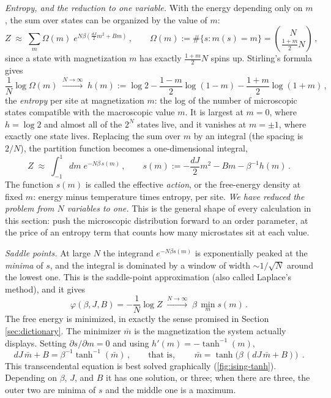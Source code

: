 \documentclass[11pt]{article}
\newcommand{\pd}{\partial}
\begin{document}
\emph{Entropy, and the reduction to one variable.} With the energy depending only on $m$, the sum over states can be organized by the value of $m$:
%
\begin{equation}
    Z \;\approx\; \sum_{m} \Omega(m)\; e^{N\beta\left(\frac{dJ}{2}m^2 + Bm\right)}\,,\qquad \Omega(m) := \#\{s : m(s) = m\} = \binom{N}{\frac{1+m}{2}N}\,,
\end{equation}
%
since a state with magnetization $m$ has exactly $\frac{1+m}{2}N$ spins up. Stirling's formula gives
%
\begin{equation}
    \frac{1}{N}\log\Omega(m) \;\xrightarrow{N\to\infty}\; h(m) := \log 2 - \frac{1-m}{2}\log(1-m) - \frac{1+m}{2}\log(1+m)\,, \label{ising-entropy}
\end{equation}
%
the \emph{entropy} per site at magnetization $m$: the log of the number of microscopic states compatible with the macroscopic value $m$. It is largest at $m=0$, where $h = \log 2$ and almost all of the $2^N$ states live, and it vanishes at $m=\pm1$, where exactly one state lives. Replacing the sum over $m$ by an integral (the spacing is $2/N$), the partition function becomes a one-dimensional integral,
%
\begin{equation}
    Z \;\approx\; \int_{-1}^{1} dm\; e^{-N\beta\, s(m)}\,,\qquad
    s(m) := -\frac{dJ}{2}m^2 - Bm - \beta^{-1}h(m)\,. \label{ising-action}
\end{equation}
%
The function $s(m)$ is called the effective \emph{action}, or the free-energy density at fixed $m$: energy minus temperature times entropy, per site. \emph{We have reduced the problem from $N$ variables to one.} This is the general shape of every calculation in this section: push the microscopic distribution forward to an order parameter, at the price of an entropy term that counts how many microstates sit at each value.

\emph{Saddle points.} At large $N$ the integrand $e^{-N\beta s(m)}$ is exponentially peaked at the \emph{minima} of $s$, and the integral is dominated by a window of width $\sim 1/\sqrt{N}$ around the lowest one. This is the saddle-point approximation (also called Laplace's method), and it gives
%
\begin{equation}
    \varphi(\beta,J,B) = -\frac{1}{N}\log Z \;\xrightarrow{N\to\infty}\; \beta\,\min_m s(m)\,. \label{ising-saddle}
\end{equation}
%
The free energy is minimized, in exactly the sense promised in Section \ref{sec:dictionary}. The minimizer $\bar m$ is the magnetization the system actually displays. Setting $\pd s/\pd m = 0$ and using $h'(m) = -\tanh^{-1}(m)$,
%
\begin{equation}
    dJ\,\bar m + B = \beta^{-1}\tanh^{-1}(\bar m)\,,\qquad\text{that is,}\qquad \boxed{\;\bar m = \tanh\big(\beta\,(dJ\,\bar m + B)\big)\;}\,. \label{ising-sc}
\end{equation}
%
This transcendental equation is best solved graphically (\cref{fig:ising-tanh}). Depending on $\beta$, $J$, and $B$ it has one solution, or three; when there are three, the outer two are minima of $s$ and the middle one is a maximum.
\end{document}
